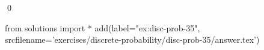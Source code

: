 
\begin{ex} 
  \label{ex:disc-prob-35}
  
  \qed
\end{ex} 
\begin{python0}
from solutions import *
add(label="ex:disc-prob-35",
    srcfilename='exercises/discrete-probability/disc-prob-35/answer.tex') 
\end{python0}
